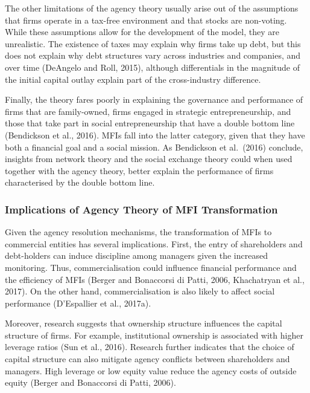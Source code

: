 \documentclass[a4paper, nobind]{templates/ociamthesis}
\begin{document}
The other limitations of the agency theory usually arise out of the assumptions that firms operate in a tax-free environment and that stocks are non-voting. While these assumptions allow for the development of the model, they are unrealistic. The existence of taxes may explain why firms take up debt, but this does not explain why debt structures vary across industries and companies, and over time (DeAngelo and Roll, 2015), although differentials in the magnitude of the initial capital outlay explain part of the cross-industry difference.

Finally, the theory fares poorly in explaining the governance and performance of firms that are family-owned, firms engaged in strategic entrepreneurship, and those that take part in social entrepreneurship that have a double bottom line (Bendickson et al., 2016). MFIs fall into the latter category, given that they have both a financial goal and a social mission. As Bendickson et al.~(2016) conclude, insights from network theory and the social exchange theory could when used together with the agency theory, better explain the performance of firms characterised by the double bottom line.

\hypertarget{implications-of-agency-theory-of-mfi-transformation}{%
\subsubsection{Implications of Agency Theory of MFI Transformation}\label{implications-of-agency-theory-of-mfi-transformation}}

\noindent Given the agency resolution mechanisms, the transformation of MFIs to commercial entities has several implications. First, the entry of shareholders and debt-holders can induce discipline among managers given the increased monitoring. Thus, commercialisation could influence financial performance and the efficiency of MFIs (Berger and Bonaccorsi di Patti, 2006, Khachatryan et al., 2017). On the other hand, commercialisation is also likely to affect social performance (D'Espallier et al., 2017a).

Moreover, research suggests that ownership structure influences the capital structure of firms. For example, institutional ownership is associated with higher leverage ratios (Sun et al., 2016). Research further indicates that the choice of capital structure can also mitigate agency conflicts between shareholders and managers. High leverage or low equity value reduce the agency costs of outside equity (Berger and Bonaccorsi di Patti, 2006).
\end{document}
